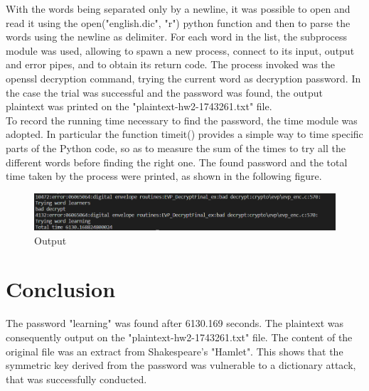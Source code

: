 \documentclass{article}
\begin{document}
With the words being separated only by a newline, it was possible to open and read it using the open("english.dic", "r") python function and then to parse the words using the newline as delimiter.
For each word in the list, the subprocess module was used, allowing to spawn a new process, connect to its input, output and error pipes, and to obtain its return code. The process invoked was the openssl decryption command, trying the current word as decryption password. In the case the trial was successful and the password was found, the output plaintext was printed on the "plaintext-hw2-1743261.txt" file. \\
To record the running time necessary to find the password, the time module was adopted. In particular the function timeit() provides a simple way to time specific parts of the Python code, so as to measure the sum of the times to try all the different words before finding the right one. The found password and the total time taken by the process were printed, as shown in the following figure.\\

\begin{figure}[h]
	\includegraphics[width=1\textwidth]{img2-hw2-1743261.png}
	\caption{Output}
\end{figure}

\section{Conclusion}
The password "learning" was found after 6130.169 seconds. The plaintext was consequently output on the "plaintext-hw2-1743261.txt" file. The content of the original file was an extract from Shakespeare's "Hamlet". This shows that the symmetric key derived from the password was vulnerable to a dictionary attack, that was successfully conducted.
\end{document}
